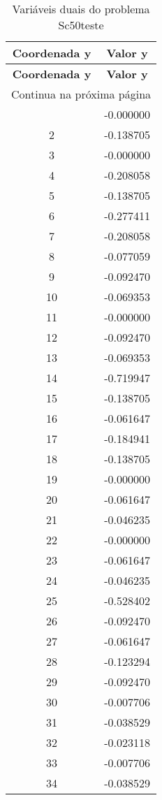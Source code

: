 \documentclass[12pt]{article}
\begin{document}
\begin{longtable}{@{}cc@{}}
\caption{Variáveis duais do problema Sc50teste} \\
\toprule
\textbf{Coordenada y} & \textbf{Valor y} \\
\midrule
\endfirsthead

\toprule
\textbf{Coordenada y} & \textbf{Valor y} \\
\midrule
\endhead

\midrule \multicolumn{2}{r}{{Continua na próxima página}} \\ \midrule
\endfoot

\bottomrule
\endlastfoot
1 & -0.000000 \\
2 & -0.138705 \\
3 & -0.000000 \\
4 & -0.208058 \\
5 & -0.138705 \\
6 & -0.277411 \\
7 & -0.208058 \\
8 & -0.077059 \\
9 & -0.092470 \\
10 & -0.069353 \\
11 & -0.000000 \\
12 & -0.092470 \\
13 & -0.069353 \\
14 & -0.719947 \\
15 & -0.138705 \\
16 & -0.061647 \\
17 & -0.184941 \\
18 & -0.138705 \\
19 & -0.000000 \\
20 & -0.061647 \\
21 & -0.046235 \\
22 & -0.000000 \\
23 & -0.061647 \\
24 & -0.046235 \\
25 & -0.528402 \\
26 & -0.092470 \\
27 & -0.061647 \\
28 & -0.123294 \\
29 & -0.092470 \\
30 & -0.007706 \\
31 & -0.038529 \\
32 & -0.023118 \\
33 & -0.007706 \\
34 & -0.038529 \\

\end{longtable}
\end{document}
